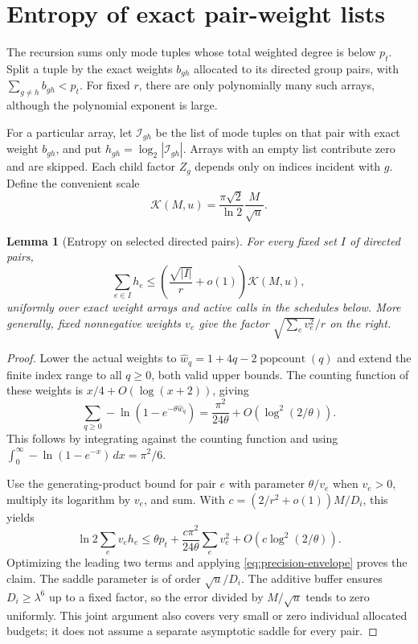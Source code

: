\documentclass[11pt]{article}
\newtheorem{lemma}[theorem]{Lemma}
\theoremstyle{definition}\newtheorem{definition}[theorem]{Definition}
\theoremstyle{remark}\newtheorem{remark}[theorem]{Remark}
\newcommand{\pc}{\operatorname{popcount}}
\newcommand{\K}{\mathcal K}
\begin{document}
\section{Entropy of exact pair-weight lists}
\label{sec:entropy}

The recursion sums only mode tuples whose total weighted degree is below
$p_t$. Split a tuple by the exact weights $b_{gh}$ allocated to its directed
group pairs, with $\sum_{g\ne h}b_{gh}<p_t$. For fixed $r$, there are only
polynomially many such arrays, although the polynomial exponent is large.

For a particular array, let $\mathcal I_{gh}$ be the list of mode tuples on
that pair with exact weight $b_{gh}$, and put
$h_{gh}=\log_2|\mathcal I_{gh}|$. Arrays with an empty list contribute zero
and are skipped. Each child factor $Z_g$ depends only on indices incident
with $g$. Define the convenient scale
\begin{equation}
 \K(M,u)=\frac{\pi\sqrt2}{\ln2}\frac M{\sqrt u}.\label{eq:K}
\end{equation}

\begin{lemma}[Entropy on selected directed pairs]\label{lem:entropy}
For every fixed set $I$ of directed pairs,
\begin{equation}
 \sum_{e\in I}h_e\le
 \left(\frac{\sqrt{|I|}}r+o(1)\right)\K(M,u),\label{eq:subset}
\end{equation}
uniformly over exact weight arrays and active calls in the schedules below.
More generally, fixed nonnegative weights $v_e$ give the factor
$\sqrt{\sum_ev_e^2}/r$ on the right.
\end{lemma}
\begin{proof}
Lower the actual weights to $\widehat w_q=1+4q-2\pc(q)$ and extend the
finite index range to all $q\ge0$, both valid upper bounds. The counting
function of these weights is $x/4+O(\log(x+2))$, giving
\[
 \sum_{q\ge0}-\ln(1-e^{-\theta\widehat w_q})
 =\frac{\pi^2}{24\theta}+O(\log^2(2/\theta)).
\]
This follows by integrating against the counting function and using
$\int_0^\infty-\ln(1-e^{-x})\,dx=\pi^2/6$.

Use the generating-product bound for pair $e$ with parameter
$\theta/v_e$ when $v_e>0$, multiply its logarithm by $v_e$, and sum.
With $c=(2/r^2+o(1))M/D_i$, this yields
\[
 \ln2\sum_ev_eh_e\le
 \theta p_t+\frac{c\pi^2}{24\theta}\sum_ev_e^2
 +O(c\log^2(2/\theta)).
\]
Optimizing the leading two terms and applying
\eqref{eq:precision-envelope} proves the claim. The saddle parameter is of
order $\sqrt u/D_i$. The additive buffer ensures $D_i\ge\lambda^6$ up to
a fixed factor, so the error divided by $M/\sqrt u$ tends to zero uniformly.
This joint argument also covers very small or zero individual allocated
budgets; it does not assume a separate asymptotic saddle for every pair.
\end{proof}
\end{document}
